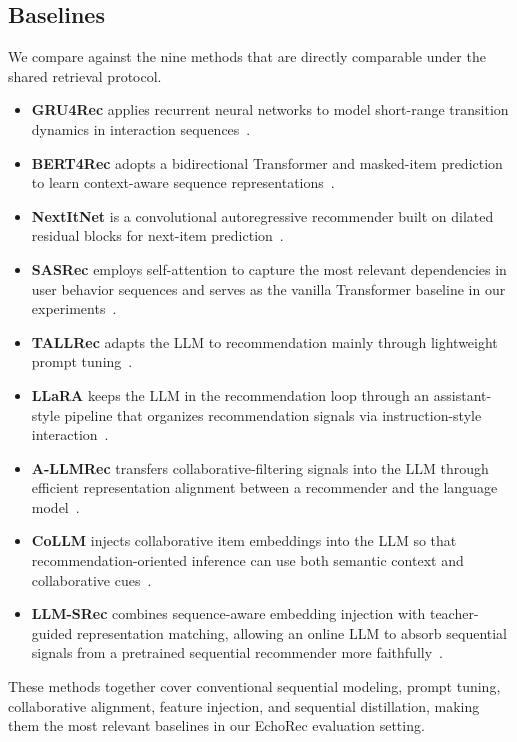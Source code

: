 ﻿\documentclass{article}
\begin{document}
\subsection{Baselines}
\label{app:baselines}

\noindent We compare against the nine methods that are directly comparable under the shared retrieval protocol.
\begin{itemize}[leftmargin=1.5em]
\item \textbf{GRU4Rec} applies recurrent neural networks to model short-range transition dynamics in interaction sequences~\cite{hidasi2016gru4rec}.
\item \textbf{BERT4Rec} adopts a bidirectional Transformer and masked-item prediction to learn context-aware sequence representations~\cite{sun2019bert4rec}.
\item \textbf{NextItNet} is a convolutional autoregressive recommender built on dilated residual blocks for next-item prediction~\cite{yuan2019nextitnet}.
\item \textbf{SASRec} employs self-attention to capture the most relevant dependencies in user behavior sequences and serves as the vanilla Transformer baseline in our experiments~\cite{kang2018sasrec}.
\item \textbf{TALLRec} adapts the LLM to recommendation mainly through lightweight prompt tuning~\cite{bao2023tallrec}.
\item \textbf{LLaRA} keeps the LLM in the recommendation loop through an assistant-style pipeline that organizes recommendation signals via instruction-style interaction~\cite{liao2024llara}.
\item \textbf{A-LLMRec} transfers collaborative-filtering signals into the LLM through efficient representation alignment between a recommender and the language model~\cite{kim2024allmrec}.
\item \textbf{CoLLM} injects collaborative item embeddings into the LLM so that recommendation-oriented inference can use both semantic context and collaborative cues~\cite{zhang2025collm}.
\item \textbf{LLM-SRec} combines sequence-aware embedding injection with teacher-guided representation matching, allowing an online LLM to absorb sequential signals from a pretrained sequential recommender more faithfully~\cite{kim2025lost}.
\end{itemize}
These methods together cover conventional sequential modeling, prompt tuning, collaborative alignment, feature injection, and sequential distillation, making them the most relevant baselines in our EchoRec evaluation setting.
\end{document}

